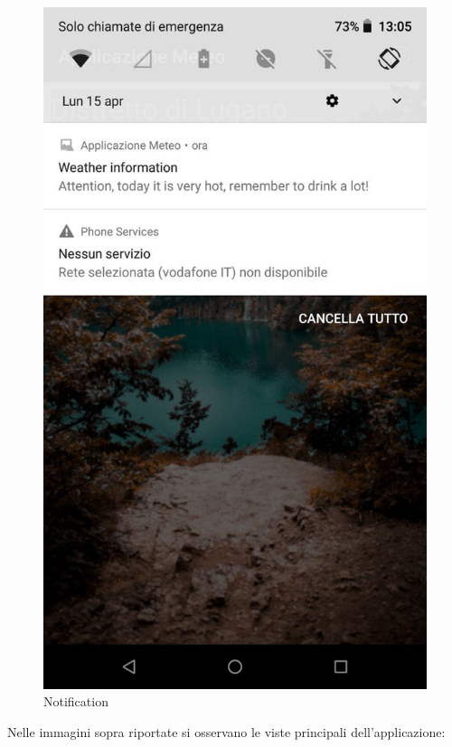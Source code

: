 \documentclass{article}
\begin{document}
\begin{figure}[!htb]
      \includegraphics[width=\linewidth]{images/sc1.jpg}
      \caption{Notification}\label{fig:awesome_image3}
    \endminipage
\end{figure}
\noindent Nelle immagini sopra riportate si osservano le viste principali dell'applicazione:
\end{document}
